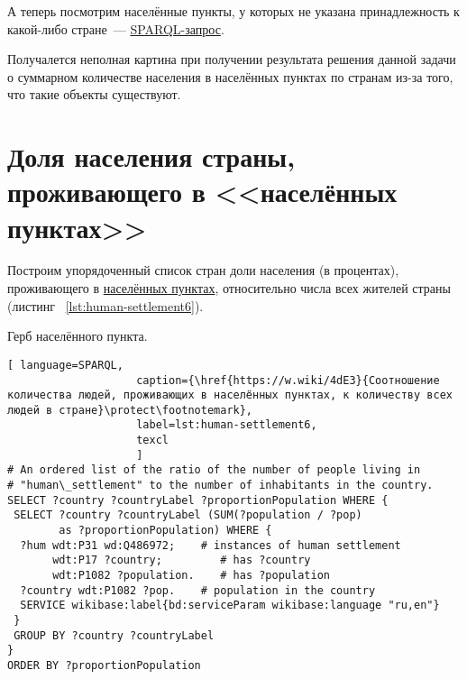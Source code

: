 А теперь посмотрим населённые пункты, у которых не указана принадлежность к какой-либо стране~--- \href{https://w.wiki/4FV8}{SPARQL-запрос}\footnotemark.

Получалется неполная картина при получении результата решения данной задачи о суммарном количестве населения в населённых пунктах по странам из-за того, что такие объекты существуют.

\section{Доля населения страны, проживающего в <<населённых пунктах>>}

Построим упорядоченный список стран доли населения (в процентах), проживающего в \href{http://www.wikidata.org/entity/Q486972}{населённых пунктах}, относительно числа всех жителей страны (листинг ~\protect\ref{lst:human-settlement6}).

\begin{marginfigure}[0.0cm]
{
\setlength{\fboxsep}{0pt}%
\setlength{\fboxrule}{1pt}%
%
}
  \caption{Герб населённого пункта.}%
  \label{fig:flag_question_human_settlements3}%
\end{marginfigure}


\begin{lstlisting}[ language=SPARQL, 
                    caption={\href{https://w.wiki/4dE3}{Соотношение количества людей, проживающих в населённых пунктах, к количеству всех людей в стране}\protect\footnotemark},
                    label=lst:human-settlement6,
                    texcl 
                    ]
# An ordered list of the ratio of the number of people living in 
# "human\_settlement" to the number of inhabitants in the country.
SELECT ?country ?countryLabel ?proportionPopulation WHERE {
 SELECT ?country ?countryLabel (SUM(?population / ?pop) 
        as ?proportionPopulation) WHERE {
  ?hum wdt:P31 wd:Q486972;    # instances of human settlement  
       wdt:P17 ?country;         # has ?country 
       wdt:P1082 ?population.    # has ?population
  ?country wdt:P1082 ?pop.    # population in the country
  SERVICE wikibase:label{bd:serviceParam wikibase:language "ru,en"}
 }
 GROUP BY ?country ?countryLabel
}
ORDER BY ?proportionPopulation
\end{lstlisting}%

